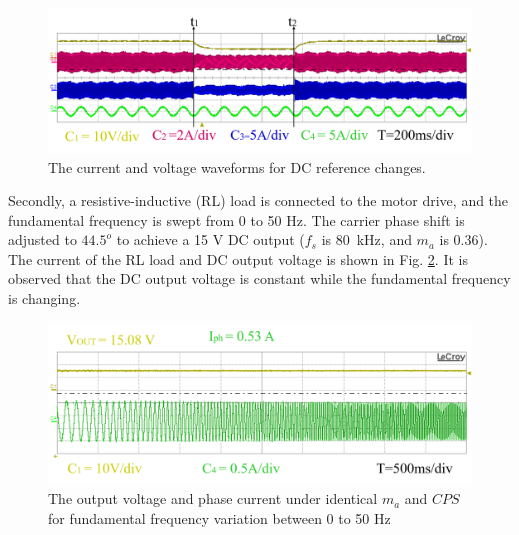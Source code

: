 \documentclass[journal]{IEEEtran}
\begin{document}
\begin{figure}[h!]
\centering
    \includegraphics[width=1\linewidth]{DC_reference.png}
        \caption{ The current and voltage waveforms for DC reference changes.} 
    \label{fig:transients_DC_references}
\end{figure}
Secondly, a resistive-inductive (RL) load is connected to the motor drive, and the fundamental frequency is swept from 0 to 50 Hz. The carrier phase shift is adjusted to $44.5^o$ to achieve a 15 V DC output ($f_s$ is 80~kHz, and $m_a$ is 0.36). The current of the RL load and DC output voltage is shown in Fig. \ref{fig:transients_frequency}. It is observed that the DC output voltage is constant while the fundamental frequency is changing.

\begin{figure}[h!]
\centering
    \includegraphics[width=1\linewidth]{fundamental_reference.png}
        \caption{ The output voltage and phase current under identical $m_a$ and $CPS$ for fundamental frequency variation between 0 to 50 Hz  } 
    \label{fig:transients_frequency}
\end{figure}

\vspace*{-12mm}
\end{document}
